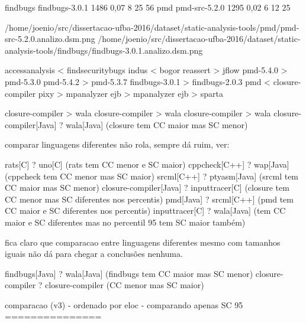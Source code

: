 findbugs	 findbugs-3.0.1	1486	0,07	8	25	56
pmd	 pmd-src-5.2.0	1295	0,02	6	12	25

/home/joenio/src/dissertacao-ufba-2016/dataset/static-analysis-tools/pmd/pmd-src-5.2.0.analizo.dsm.png
/home/joenio/src/dissertacao-ufba-2016/dataset/static-analysis-tools/findbugs/findbugs-3.0.1.analizo.dsm.png

accessanalysis < findsecuritybugs
indus < bogor
reassert > jflow
pmd-5.4.0 > pmd-5.3.0
pmd-5.4.2 > pmd-5.3.7
findbugs-3.0.1 > findbugs-2.0.3
pmd < closure-compiler
pixy > mpanalyzer
ejb > mpanalyzer
ejb > sparta

closure-compiler > wala
closure-compiler > wala
closure-compiler > wala
closure-compiler[Java] ? wala[Java]     (closure tem CC maior mas SC menor)

comparar linguagens diferentes não rola, sempre dá ruim, ver:

rats[C]        ? uno[C]                 (rats tem CC menor e SC maior)
cppcheck[C++]  ? wap[Java]              (cppcheck tem CC menor mas SC maior)
srcml[C++]     ? ptyasm[Java]           (srcml tem CC maior mas SC menor)
closure-compiler[Java] ? inputtracer[C] (closure tem CC menor mas SC diferentes nos percentis)
pmd[Java] ? srcml[C++]                  (pmd tem CC maior e SC diferentes nos percentis)
inputtracer[C] ? wala[Java]             (tem CC maior e SC diferentes mas no percentil 95 tem SC maior também)

fica claro que comparacao entre linguagens diferentes mesmo com tamanhos iguais não dá para chegar a conclusões nenhuma.

findbugs[Java] ? wala[Java]             (findbugs tem CC maior mas SC menor)
closure-compiler ? closure-compiler     (CC menor mas SC maior)

comparacao (v3) - ordenado por eloc - comparando apenas SC 95
===============





